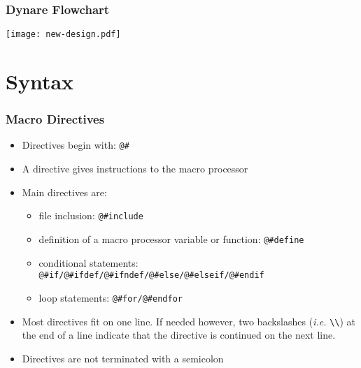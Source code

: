 \documentclass[aspectratio=169]{beamer}
\begin{document}
\begin{frame}
  \frametitle{Dynare Flowchart}
  \texttt{[image: new-design.pdf]}
\end{frame}

\section{Syntax}

\begin{frame}[fragile=singleslide]
  \frametitle{Macro Directives}
  \begin{itemize}
  \item Directives begin with: \verb+@#+
  \item A directive gives instructions to the macro processor
  \item Main directives are:
    \begin{itemize}
    \item file inclusion: \verb+@#include+
    \item definition of a macro processor variable or function: \verb+@#define+
    \item conditional statements: \verb+@#if/@#ifdef/@#ifndef/@#else/@#elseif/@#endif+
    \item loop statements: \verb+@#for/@#endfor+
    \end{itemize}
  \item Most directives fit on one line. If needed however, two backslashes (\textit{i.e.} \verb+\\+) at the end of a line indicate that the directive is continued on the next line.
  \item Directives are not terminated with a semicolon
  \end{itemize}
\end{frame}
\end{document}
